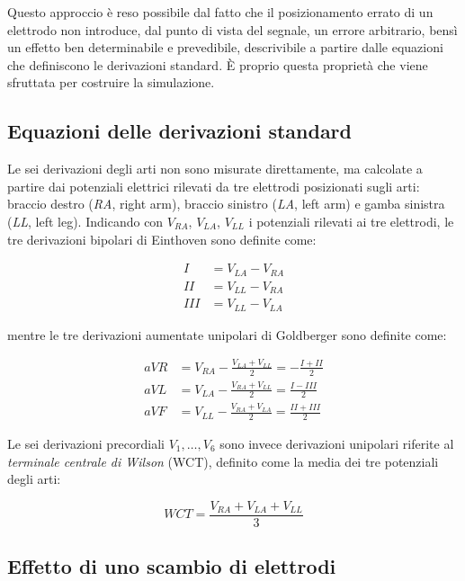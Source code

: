 Questo approccio è reso possibile dal fatto che il posizionamento errato di un elettrodo non introduce, dal punto di vista del segnale, un errore arbitrario, bensì un effetto ben determinabile e prevedibile, descrivibile a partire dalle equazioni che definiscono le derivazioni standard. È proprio questa proprietà che viene sfruttata per costruire la simulazione.

\subsection{Equazioni delle derivazioni standard}

Le sei derivazioni degli arti non sono misurate direttamente, ma calcolate a partire dai potenziali elettrici rilevati da tre elettrodi posizionati sugli arti: braccio destro (\textit{RA}, right arm), braccio sinistro (\textit{LA}, left arm) e gamba sinistra (\textit{LL}, left leg). Indicando con $V_{RA}$, $V_{LA}$, $V_{LL}$ i potenziali rilevati ai tre elettrodi, le tre derivazioni bipolari di Einthoven sono definite come:

\begin{align}
	I   &= V_{LA} - V_{RA} \\
	II  &= V_{LL} - V_{RA} \\
	III &= V_{LL} - V_{LA}
\end{align}

mentre le tre derivazioni aumentate unipolari di Goldberger sono definite come:

\begin{align}
	aVR &= V_{RA} - \frac{V_{LA} + V_{LL}}{2} = -\frac{I + II}{2}\\
	aVL &= V_{LA} - \frac{V_{RA} + V_{LL}}{2} = \frac{I-III}{2}\\
	aVF &= V_{LL} - \frac{V_{RA} + V_{LA}}{2} = \frac{II+III}{2}
\end{align}

Le sei derivazioni precordiali $V_1, \dots, V_6$ sono invece derivazioni unipolari riferite al \emph{terminale centrale di Wilson} (WCT), definito come la media dei tre potenziali degli arti:

\begin{equation}
	WCT = \frac{V_{RA} + V_{LA} + V_{LL}}{3}
\end{equation}

\subsection{Effetto di uno scambio di elettrodi}

